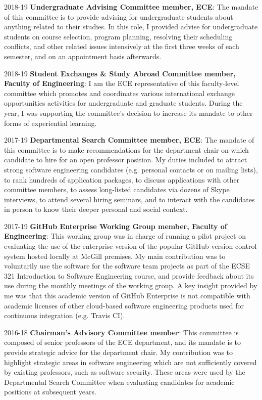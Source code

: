 \begin{yearlist}
\item[2018-19] \textbf{Undergraduate Advising Committee member, ECE}: 
The mandate of this committee is to provide advising for undergraduate students about anything related to their studies. 
In this role, I provided advise for undergraduate students on course selection, program planning, resolving their scheduling conflicts, and other related issues intensively at the first three weeks of each semester, and on an appointment basis afterwards. 


\item[2018-19] \textbf{Student Exchanges \& Study Abroad Committee member, Faculty of Engineering}: I am the ECE representative of this faculty-level committee which promotes and coordinates various international exchange opportunities activities for undergraduate and graduate students. During the year, I was supporting the committee's decision to increase its mandate to other forms of experiential learning. 
\item[2017-19] \textbf{Departmental Search Committee member, ECE}: The mandate of this committee is to make recommendations for the department chair on which candidate to hire for an open professor position. My duties included to attract strong software engineering candidates (e.g. personal contacts or on mailing lists), to rank hundreds of application packages, to discuss applications with other committee members, to assess long-listed candidates via dozens of Skype interviews, to attend several hiring seminars, and to interact with the candidates in person to know their deeper personal and social context.
\item[2017-19] \textbf{GitHub Enterprise Working Group member, Faculty of Engineering}: This working group was in charge of running a pilot project on evaluating the use of the enterprise version of the popular GitHub version control system hosted locally at McGill premises. My main contribution was to voluntarily use the software for the software team projects as part of the ECSE 321 Introduction to Software Engineering course, and provide feedback about its use during the monthly meetings of the working group. A key insight provided by me was that this academic version of GitHub Enterprise is not compatible with academic licenses of other cloud-based software engineering products used for continuous integration (e.g. Travis CI).
\item[2016-18] \textbf{Chairman's Advisory Committee member}: This committee is composed of senior professors of the ECE department, and its mandate is to provide strategic advice for the department chair. My contribution was to highlight strategic areas in software engineering which are not sufficiently covered by existing professors, such as software security. These areas were used by the Departmental Search Committee when evaluating candidates for academic positions at subsequent years.

\end{yearlist}
